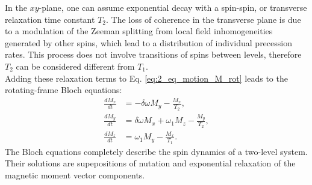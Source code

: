 \documentclass[a4paper]{book}
\begin{document}
	In the $xy$-plane, one can assume exponential decay with a spin-spin, or transverse relaxation time constant $T_2$. The loss of coherence in the transverse plane is due to a modulation of the Zeeman splitting from local field inhomogeneities generated by other spins, which lead to a distribution of individual precession rates. This process does not involve transitions of spins between levels, therefore $T_2$ can be considered different from $T_1$.\\
	Adding these relaxation terms to Eq. \eqref{eq:2_eq_motion_M_rot} leads to the rotating-frame Bloch equations:
	\begin{subequations}
		\label{eq:2_Bloch_eq}
		\begin{align}
			\frac{dM_{x}}{dt} & = - \delta \omega M_{y} - \frac{M_{x}}{T_2},\\
			\frac{dM_{y}}{dt} & = \delta \omega M_{x} + \omega_1 M_{z} - \frac{M_{y}}{T_2},\\
			\frac{dM_{z}}{dt} & = \omega_1 M_{y} - \frac{M_{x}}{T_1}.
		\end{align}
	\end{subequations}	
	The Bloch equations completely describe the spin dynamics of a two-level system. Their solutions are supepositions of nutation and exponential relaxation of the magnetic moment vector components.
	
\end{document}
